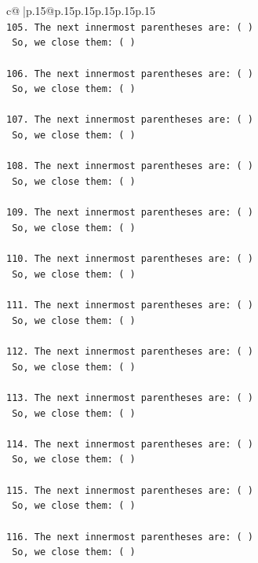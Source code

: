 \documentclass{article}
\begin{document}
{\begin{supertabular}{c@{$\;$}|p{.15\linewidth}@{}p{.15\linewidth}p{.15\linewidth}p{.15\linewidth}p{.15\linewidth}p{.15\linewidth}}
{{{\\ 
\texttt{105. The next innermost parentheses are: ( ) } \\
\texttt{    So, we close them: ( ) } \\
\\ 
\texttt{106. The next innermost parentheses are: ( ) } \\
\texttt{    So, we close them: ( ) } \\
\\ 
\texttt{107. The next innermost parentheses are: ( ) } \\
\texttt{    So, we close them: ( ) } \\
\\ 
\texttt{108. The next innermost parentheses are: ( ) } \\
\texttt{    So, we close them: ( ) } \\
\\ 
\texttt{109. The next innermost parentheses are: ( ) } \\
\texttt{    So, we close them: ( ) } \\
\\ 
\texttt{110. The next innermost parentheses are: ( ) } \\
\texttt{    So, we close them: ( ) } \\
\\ 
\texttt{111. The next innermost parentheses are: ( ) } \\
\texttt{    So, we close them: ( ) } \\
\\ 
\texttt{112. The next innermost parentheses are: ( ) } \\
\texttt{    So, we close them: ( ) } \\
\\ 
\texttt{113. The next innermost parentheses are: ( ) } \\
\texttt{    So, we close them: ( ) } \\
\\ 
\texttt{114. The next innermost parentheses are: ( ) } \\
\texttt{    So, we close them: ( ) } \\
\\ 
\texttt{115. The next innermost parentheses are: ( ) } \\
\texttt{    So, we close them: ( ) } \\
\\ 
\texttt{116. The next innermost parentheses are: ( ) } \\
\texttt{    So, we close them: ( ) } \\
}}}
\end{supertabular}}
\end{document}
